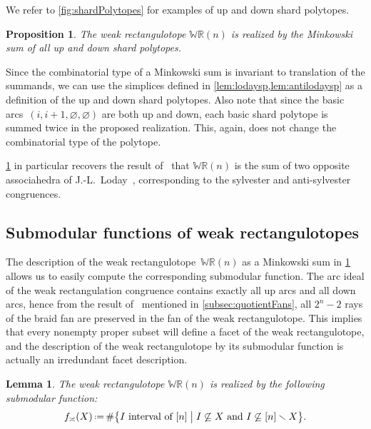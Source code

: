 \documentclass{amsart}
\newtheorem{proposition}[theorem]{Proposition}
\newtheorem{lemma}[theorem]{Lemma}
\theoremstyle{definition}
\newcommand{\bigset}[2]{\big\{ #1 \;\big|\; #2 \big\}} %
\newcommand{\ssm}{\smallsetminus} %
\newcommand{\eqdef}{\mbox{\,\raisebox{0.2ex}{\scriptsize\ensuremath{\mathrm:}}\ensuremath{=}\,}} %
\newcommand{\polytope}[1]{\mathds{#1}} %
\newcommand{\WRP}{\polytope{WR}} %
\newcommand{\weakeq}{\asymp}
\begin{document}
We refer to \cref{fig:shardPolytopes} for examples of up and down shard polytopes.

\begin{proposition}
  \label{prop:weakMinkowski}
  The weak rectangulotope $\WRP(n)$ is realized by the Minkowski sum of all up and down shard polytopes.
\end{proposition}

Since the combinatorial type of a Minkowski sum is invariant to translation of the summands, we can use the simplices defined in \cref{lem:lodaysp,lem:antilodaysp} as a definition of the up and down shard polytopes.
Also note that since the basic arcs~$(i, i+1, \varnothing, \varnothing)$ are both up and down, each basic shard polytope is summed twice in the proposed realization.
This, again, does not change the combinatorial type of the polytope.

\cref{prop:weakMinkowski} in particular recovers the result of~\cite{MR2871762} that $\WRP(n)$ is the sum of two opposite associahedra of J.-L.~Loday~\cite{MR2871762}, corresponding to the sylvester and anti-sylvester congruences.


\subsection{Submodular functions of weak rectangulotopes}
\label{subsec:submodularWeakRectangulotopes}

The description of the weak rectangulotope~$\WRP(n)$ as a Minkowski sum in \cref{prop:weakMinkowski} allows us to easily compute the corresponding submodular function.
The arc ideal of the weak rectangulation congruence contains exactly all up arcs and all down arcs, hence from the result of~\cite{MR4328906} mentioned in \cref{subsec:quotientFans}, all $2^n-2$ rays of the braid fan are preserved in the fan of the weak rectangulotope.
This implies that every nonempty proper subset will define a facet of the weak rectangulotope, and the description of the weak rectangulotope by its submodular function is actually an irredundant facet description.

\begin{lemma}
  The weak rectangulotope $\WRP(n)$ is realized by the following submodular function:
  \[
  f_{\weakeq}(X) \eqdef \#\bigset{ I\text{ interval of } [n] }{ I \not\subseteq X \text{ and } I \not\subseteq [n]\ssm X }.
  \]
\end{lemma}
\end{document}

